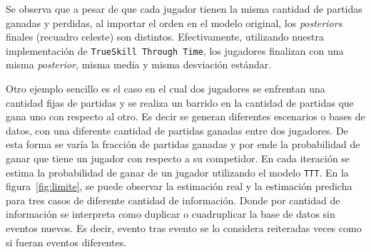 \documentclass[11pt,twoside,spanish]{report} %
\begin{document}
\begin{table}[H]
\centering
{}
\caption{\textit{Posteriors} de 3 partidas utilizando \texttt{TrueSkill}, con jugadores inicializados con una media de 25 y una incertidumbre de 6. Se recuadra en celeste el \textit{posterior} final de cada jugador.}
\label{tab:abc}
\end{table}



Se observa que a pesar de que cada jugador tienen la misma cantidad de partidas ganadas y perdidas, al importar el orden en el modelo original, los \textit{posteriors} finales (recuadro celeste) son distintos.
Efectivamente, utilizando nuestra implementaci\'on de \texttt{TrueSkill Through Time}, los jugadores finalizan con una misma \textit{posterior}, misma media y misma desviaci\'on est\'andar.

Otro ejemplo sencillo es el caso en el cual dos jugadores se enfrentan una cantidad fijas de partidas y se realiza un barrido en la cantidad de partidas que gana uno con respecto al otro.
Es decir se generan diferentes escenarios o bases de datos, con una diferente cantidad de partidas ganadas entre dos jugadores.
De esta forma se var\'ia la fracci\'on de partidas ganadas y por ende la probabilidad de ganar que tiene un jugador con respecto a su competidor.
En cada iteraci\'on se estima la probabilidad de ganar de un jugador utilizando el modelo \texttt{TTT}.
En la figura~\ref{fig:limite}, se puede observar la estimaci\'on real y la estimaci\'on predicha para tres casos de diferente cantidad de informaci\'on.
Donde por cantidad de informaci\'on se interpreta como duplicar o cuadruplicar la base de datos sin eventos nuevos.
Es decir, evento tras evento se lo considera reiteradas veces como si fueran eventos diferentes.
\end{document}
